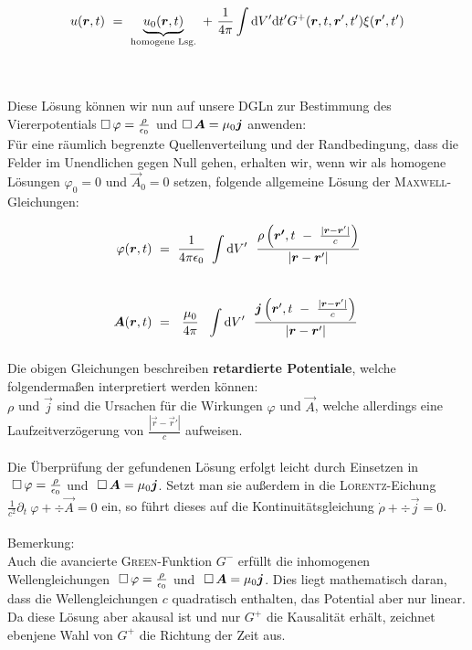 \begin{equation*}
u(\vec{r},t) \ = \ \underbrace{u_0(\vec{r},t)}_{\text{homogene Lsg.}} \ + \ \frac{1}{4\pi}\int\d V' \d t' G^+(\vec{r},t,\vec{r}',t')\xi (\vec{r}',t')
\end{equation*}

\ \\
\ \\

Diese Lösung können wir nun auf unsere DGLn zur Bestimmung des Viererpotentials $\mathop{{}\Box}\nolimits\varphi = \frac{\rho}{\epsilon_0}$ und $\mathop{{}\Box}\nolimits\bm{A}= \mu_0\bm{j}$ anwenden:\\
Für eine räumlich begrenzte Quellenverteilung und der Randbedingung, dass die Felder im Unendlichen gegen Null gehen, erhalten wir, wenn wir als homogene Lösungen $\varphi_0=0$ und $\vec{A}_0=0$ setzen, folgende allgemeine Lösung der \textsc{Maxwell}-Gleichungen:

\begin{align*}
\varphi(\vec{r},t)  \ &= \ \frac{1}{4\pi\epsilon_0} \ \Int{}{}{V'} \ \frac{\rho\left(\vec{r'}, t \ - \ \frac{|\vec{r}-\vec{r}'|}{c}\right)}{|\vec{r}-\vec{r}'|}\\
\ \\
\vec{A}(\vec{r},t)  \ &= \ \ \frac{\mu_0}{4\pi} \ \ \Int{}{}{V'} \ \frac{\vec{j}\left(\vec{r}',t \ - \ \frac{|\vec{r}-\vec{r}'|}{c}\right)}{|\vec{r}-\vec{r}'|} 
\end{align*}

Die obigen Gleichungen beschreiben \textbf{retardierte Potentiale}, welche folgendermaßen interpretiert werden können:\\
$\rho$ und $\vec{j}$ sind die Ursachen für die Wirkungen $\varphi$ und $\vec{A}$, welche allerdings eine Laufzeitverzögerung von $\frac{|\vec{r}-\vec{r}'|}{c}$ aufweisen.\\
\ \\

Die Überprüfung der gefundenen Lösung erfolgt leicht durch Einsetzen in $ \ \Dalembert\varphi=\frac{\rho}{\epsilon_0}$ und $\ \mathop{{}\Box}\nolimits\bm{A} = \mu_0\bm{j}$. Setzt man sie außerdem in die \textsc{Lorentz}-Eichung $\frac{1}{c^2}\partial_t \ \varphi + \div\vec{A} =0$ ein, so führt dieses auf die Kontinuitätsgleichung $\dot{\rho} + \div\vec{j}=0$.\\
\ \\
Bemerkung:\\
Auch die avancierte \textsc{Green}-Funktion $G^-$ erfüllt die inhomogenen Wellengleichungen $\ \Dalembert\varphi=\frac{\rho}{\epsilon_0}$ und $\ \mathop{{}\Box}\nolimits\bm{A} = \mu_0\bm{j}$. Dies liegt mathematisch daran, dass die Wellengleichungen $c$ quadratisch enthalten, das Potential aber nur linear. Da diese Lösung aber akausal ist und nur $G^+$ die Kausalität erhält, zeichnet ebenjene Wahl von $G^+$ die Richtung der Zeit aus.


